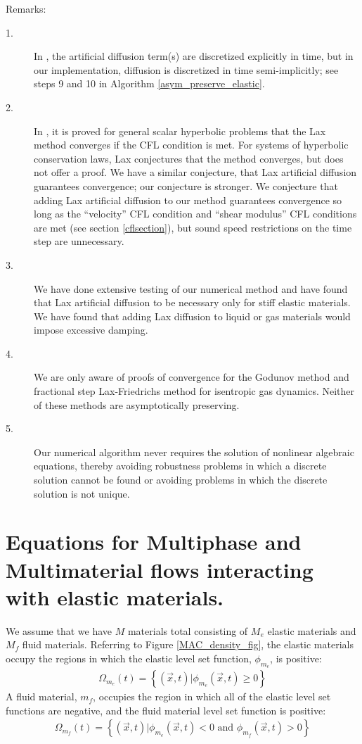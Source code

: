 \documentclass[]{article}
\begin{document}
Remarks:
\begin{description}
\item[1.] In \cite{Lax1954}, the artificial diffusion term(s) are discretized
  explicitly in time, but in our implementation, diffusion is discretized
  in time semi-implicitly; see steps 9 and 10 in 
  Algorithm \ref{asym_preserve_elastic}.
\item[2.] In \cite{Lax1954}, it is proved for general scalar hyperbolic
  problems that the Lax method converges if the CFL condition
  is met.  For systems of hyperbolic conservation laws, Lax 
  conjectures that the method converges, but does not offer a proof.  
  We have a similar conjecture, that Lax artificial diffusion guarantees 
  convergence; our conjecture is stronger.  We conjecture
  that adding Lax artificial diffusion to our method guarantees
  convergence so long as the ``velocity'' CFL condition and 
  ``shear modulus'' CFL conditions are 
  met (see section \ref{cflsection}), 
  but sound speed restrictions
  on the time step are unnecessary.
\item[3.] We have done extensive testing of our numerical method and have
  found that Lax artificial diffusion to be necessary only for stiff
  elastic materials.  We have found that adding Lax diffusion to 
  liquid or gas materials would impose excessive damping.
\item[4.] We are only aware of proofs of convergence
  for the Godunov method and
  fractional step Lax-Friedrichs method for isentropic gas
  dynamics\cite{xiaxi1989convergence}.  Neither of these methods
  are asymptotically preserving.
\item[5.] Our numerical algorithm never requires the solution of 
  nonlinear algebraic equations, thereby avoiding robustness problems
  in which a discrete solution cannot be found or avoiding problems in
  which the discrete solution is not unique.
\end{description}

\section{Equations for Multiphase and Multimaterial flows interacting
 with elastic materials.}

We assume that we have $M$ materials total consisting of $M_{e}$ elastic 
materials and $M_{f}$ fluid materials.
Referring to Figure
\ref{MAC_density_fig}, the elastic materials occupy the regions in which
the elastic level set function\cite{osher1988fronts}, 
$\phi_{m_{e}}$, is positive:
\begin{eqnarray}
 \Omega_{m_{e}}(t)=\left\{ (\vec{x},t) | \phi_{m_{e}}(\vec{x},t)\ge 0 \right\}
\end{eqnarray}
A fluid material, $m_{f}$, occupies the region in which all of the elastic
level set functions\cite{osher1988fronts} 
are negative, and the fluid material level set
function is positive:
\begin{eqnarray}
\Omega_{m_{f}}(t)=\left\{ (\vec{x},t) | \phi_{m_{e}}(\vec{x},t)< 0 \mbox{ and }
  \phi_{m_{f}}(\vec{x},t)> 0 \right\}
\end{eqnarray}
\end{document}
